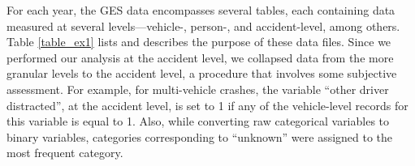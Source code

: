 For each year, the GES data encompasses several tables, each containing data
measured at several levels---vehicle-, person-, and accident-level,
among others. Table \ref{table_ex1} lists and describes the purpose of these data files. Since we performed our analysis at the accident level, we collapsed data from the more granular levels to the accident level, a procedure that involves some subjective assessment. For example, for multi-vehicle crashes, the variable ``other driver distracted'', at the accident level, is set to 1 if any of the vehicle-level records for this variable is equal to 1. Also, while converting raw categorical variables to binary variables, categories corresponding to ``unknown'' were assigned to the most frequent category.

